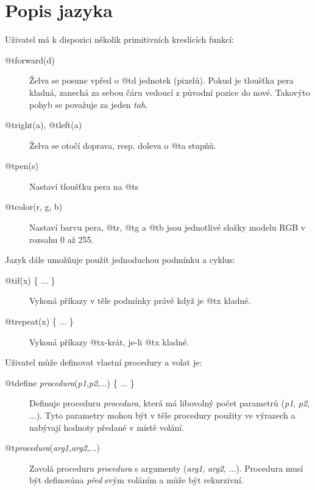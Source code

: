 \section{Popis jazyka}

Uživatel má k dispozici několik primitivních kreslících funkcí:

\begin{description}
\item[@t{forward(d)}] Želva se posune vpřed o @t{d} jednotek (pixelů).
Pokud je tloušťka pera kladná, zanechá za sebou čáru vedoucí z původní pozice do
nové. Takovýto pohyb se považuje za jeden \emph{tah}.
\item[@t{right(a)}, @t{left(a)}] Želva se otočí doprava, resp. doleva o
@t{a} stupňů.
\item[@t{pen(s)}] Nastaví tloušťku pera na @t{s}
\item[@t{color(r, g, b)}] Nastaví barvu pera, @t{r}, @t{g} a
@t{b} jsou jednotlivé složky modelu RGB v rozsahu 0 až 255.
\end{description}

Jazyk dále umožňuje použít jednoduchou podmínku a cyklus:

\begin{description}
\item[@t{if(x) \{ ... \}}] Vykoná příkazy v těle podmínky právě když je
@t{x} kladné.
\item[@t{repeat(x) \{ ... \}}] Vykoná příkazy @t{x}-krát, je-li
@t{x} kladné.
\end{description}

Uživatel může definovat vlastní procedury a volat je:

\begin{description}

\item[@t{define 
  \textsl{procedura}(\textsl{p1},\textsl{p2},...)
  \{ ... \}
}]
  Definuje proceduru \textsl{procedura}, která má libovolný počet parametrů
  (\textsl{p1}, \textsl{p2}, ...). Tyto parametry mohou být v těle procedury
  použity ve výrazech a nabývají hodnoty předané v místě volání.

\item[@t{\textsl{procedura}(\textsl{arg1},\textsl{arg2},...)}]
  Zavolá proceduru \textsl{procedura} s argumenty (\textsl{arg1}, \textsl{arg2},
  ...). Procedura musí být definována \emph{před} svým voláním a může být
  rekurzivní.

\end{description}

